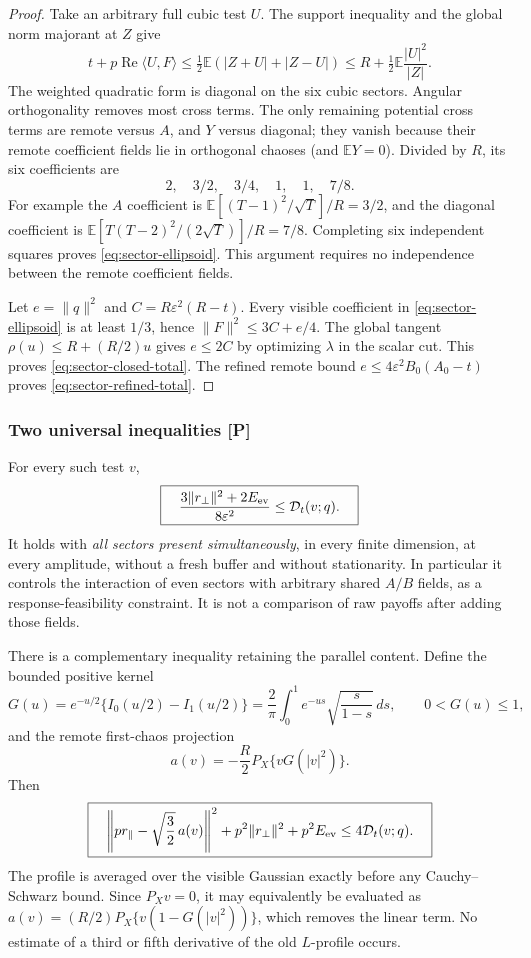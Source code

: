 \begin{proof}
Take an arbitrary full cubic test $U$. The support inequality and the
global norm majorant at $Z$ give
\[
 t+p\operatorname{Re}\langle U,F\rangle
 \le\tfrac12\mathbb E(|Z+U|+|Z-U|)
 \le R+\tfrac12\mathbb E\frac{|U|^2}{|Z|}.
\]
The weighted quadratic form is diagonal on the six cubic sectors.
Angular orthogonality removes most cross terms. The only remaining
potential cross terms are remote versus $A$, and $Y$ versus diagonal;
they vanish because their remote coefficient fields lie in orthogonal
chaoses (and $\mathbb EY=0$). Divided by $R$, its six coefficients are
\[
 2,\quad 3/2,\quad3/4,\quad1,\quad1,\quad7/8.
\]
For example the $A$ coefficient is
$\mathbb E[(T-1)^2/\sqrt T]/R=3/2$, and the diagonal coefficient is
$\mathbb E[T(T-2)^2/(2\sqrt T)]/R=7/8$.
Completing six independent squares proves
\eqref{eq:sector-ellipsoid}. This argument requires no independence
between the remote coefficient fields.

Let $e=\|q\|^2$ and $C=R\varepsilon^2(R-t)$. Every visible coefficient
in \eqref{eq:sector-ellipsoid} is at least $1/3$, hence
$\|F\|^2\le3C+e/4$.
The global tangent $\rho(u)\le R+(R/2)u$ gives $e\le2C$ by
optimizing $\lambda$ in the scalar cut. This proves
\eqref{eq:sector-closed-total}. The refined remote bound
$e\le4\varepsilon^2B_0(A_0-t)$ proves
\eqref{eq:sector-refined-total}.
\end{proof}

\subsubsection{Two universal inequalities [P]}
For every such test $v$,
\begin{equation}\label{eq:sector-effective-moment}
 \boxed{\quad
 \frac{3\|r_\perp\|^2+2E_{\rm ev}}{8\varepsilon^2}
 \le\mathcal D_t(v;q).\quad}
\end{equation}
It holds with \emph{all sectors present simultaneously}, in every
finite dimension, at every amplitude, without a fresh buffer and without
stationarity. In particular it controls the interaction of even sectors
with arbitrary shared $A/B$ fields, as a response-feasibility constraint.
It is not a comparison of raw payoffs after adding those fields.

There is a complementary inequality retaining the parallel content.
Define the bounded positive kernel
\[
 G(u)=e^{-u/2}\{I_0(u/2)-I_1(u/2)\}
 =\frac2\pi\int_0^1e^{-us}\sqrt{\frac{s}{1-s}}\,ds,
 \qquad 0<G(u)\le1,
\]
and the remote first-chaos projection
\[
 a(v)=-\frac R2 P_X\{vG(|v|^2)\}.
\]
Then
\begin{equation}\label{eq:sector-joint-profile}
 \boxed{\quad
 \left\|p r_\parallel-\sqrt{\frac32}\,a(v)\right\|^2
       +p^2\|r_\perp\|^2+p^2E_{\rm ev}
 \le4\mathcal D_t(v;q).\quad}
\end{equation}
The profile is averaged over the visible Gaussian exactly before any
Cauchy--Schwarz bound. Since $P_Xv=0$, it may equivalently be evaluated as
$a(v)=(R/2)P_X\{v(1-G(|v|^2))\}$, which removes the linear term.
No estimate of a third or fifth derivative of the old $L$-profile occurs.

